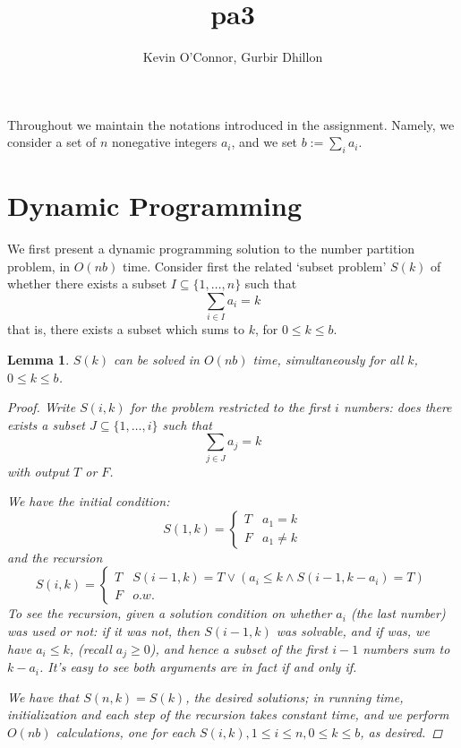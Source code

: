 \documentclass[final]{article}
\newtheorem{lemma}[theorem]{Lemma}
\begin{document}
\title{pa3}
\author{Kevin O'Connor, Gurbir Dhillon}
\maketitle

Throughout we maintain the notations introduced in the assignment. Namely, we consider a set of $n$ nonegative integers $a_i$, and we set $b := \sum_i a_i$.

\section{Dynamic Programming}

We first present a dynamic programming solution to the number partition problem, in $O(nb)$ time. Consider first the related `subset problem' $S(k)$ of whether there exists a subset $I \subseteq \{1, \ldots, n\}$ such that $$\sum_{i \in I} a_i = k$$that is, there exists a subset which sums to $k$, for $0 \leqslant k \leqslant b$. 


\begin{lemma}
$S(k)$ can be solved in $O(nb)$ time, simultaneously for all $k$, $0 \leqslant k \leqslant b$. 

\begin{proof}
Write $S(i,k)$ for the problem restricted to the first $i$ numbers: does there exists a subset $J \subseteq \{1, \ldots, i\}$ such that $$\sum_{j \in J} a_j = k$$with output $T$ or $F$.

We have the initial condition: $$S(1,k) = \begin{cases} T & a_1 = k \\ F & a_1 \neq k \end{cases}$$and the recursion$$S(i,k) = \begin{cases} T & S(i-1,k)  = T \lor (a_i \leqslant k \land S(i-1, k-a_i) = T) \\ F & o.w. \end{cases}$$To see the recursion, given a solution condition on whether $a_i$ (the last number) was used or not: if it was not, then $S(i-1,k)$ was solvable, and if was, we have $a_i \leqslant k$, (recall $a_j \geqslant 0$), and hence a subset of the first $i-1$ numbers sum to $k - a_i$. It's easy to see both arguments are in fact if and only if. 

We have that $S(n,k) = S(k)$, the desired solutions; in running time, initialization and each step of the recursion takes constant time, and we perform $O(nb)$ calculations, one for each $S(i,k), 1 \leqslant i \leqslant n, 0 \leqslant k \leqslant b$, as desired. 



\end{proof}


\end{lemma}
\end{document}
